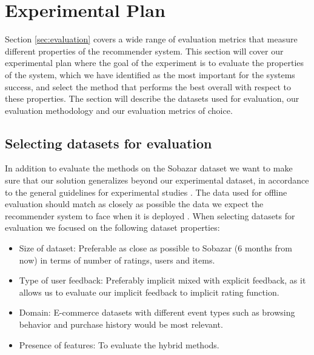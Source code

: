 
\section{Experimental Plan}


Section \ref{sec:evaluation} covers a wide range of evaluation metrics that measure different properties of the recommender system. This section will cover our experimental plan where the goal of the experiment is to evaluate the properties of the system, which we have identified as the most important for the systems success, and select the method that performs the best overall with respect to these properties. The section will describe the datasets used for evaluation, our evaluation methodology and our evaluation metrics of choice.

\subsection{Selecting datasets for evaluation}

In addition to evaluate the methods on the Sobazar dataset we want to make sure that our solution generalizes beyond our experimental dataset, in accordance to the general guidelines for experimental studies \cite{Shani2011}. The data used for offline evaluation should match as closely as possible the data we expect the recommender system to face when it is deployed \cite{Gunawardana2009}. When selecting datasets for evaluation we focused on the following dataset properties:

\begin{itemize}
\item Size of dataset: Preferable as close as possible to Sobazar (6 months from now) in terms of number of ratings, users and items.
\item Type of user feedback: Preferably implicit mixed with explicit feedback, as it allows us to evaluate our implicit feedback to implicit rating function.
\item Domain: E-commerce datasets with different event types such as browsing behavior and purchase history would be most relevant.
\item Presence of features: To evaluate the hybrid methods.
\end{itemize}

